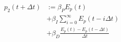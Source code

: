 \begin{equation}
\begin{split}
	p_2(t+\Delta t) &:= \beta_P E_{p}(t)\\
	&+ \beta_I \sum_{i=0}^\infty E_{p}(t-i\Delta t)\\
	&+ \beta_D \frac{E_{p}(t)-E_{p}(t-\Delta t)}{\Delta t}
\end{split}
\label{ch2:equ:corrective-component-power}
\end{equation}